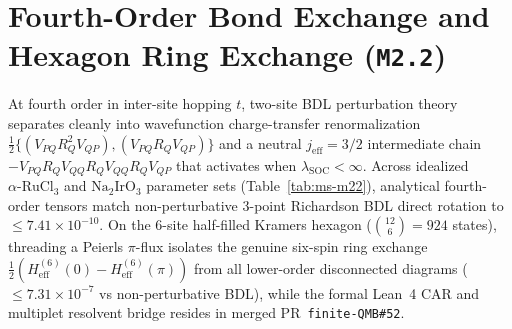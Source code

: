 \documentclass[11pt,a4paper]{article}
\begin{document}
\section{Fourth-Order Bond Exchange and Hexagon Ring Exchange (\texttt{M2.2})}
At fourth order in inter-site hopping $t$, two-site BDL perturbation theory separates cleanly into wavefunction charge-transfer renormalization $\frac{1}{2}\{(V_{PQ}R_Q^2V_{QP}),(V_{PQ}R_QV_{QP})\}$ and a neutral $j_{\mathrm{eff}}=3/2$ intermediate chain $-V_{PQ}R_QV_{QQ}R_QV_{QQ}R_QV_{QP}$ that activates when $\lambda_{\mathrm{SOC}} < \infty$. Across idealized $\alpha\text{-RuCl}_3$ and $\text{Na}_2\text{IrO}_3$ parameter sets (Table~\ref{tab:ms-m22}), analytical fourth-order tensors match non-perturbative $3$-point Richardson BDL direct rotation to $\le 7.41\times 10^{-10}$. On the $6$-site half-filled Kramers hexagon ($\binom{12}{6}=924$ states), threading a Peierls $\pi$-flux isolates the genuine six-spin ring exchange $\frac{1}{2}(H_{\mathrm{eff}}^{(6)}(0) - H_{\mathrm{eff}}^{(6)}(\pi))$ from all lower-order disconnected diagrams ($\le 7.31\times 10^{-7}$ vs non-perturbative BDL), while the formal Lean~4 CAR and multiplet resolvent bridge resides in merged PR~\texttt{finite-QMB\#52}.

\begin{table}[htbp]
  \centering
  \scriptsize
  \caption{Fourth-order exchange decomposition and 6-site hexagon ring-exchange benchmarks across idealized Hubbard--Kanamori--SOC parameter sets.}
  \label{tab:ms-m22}
\end{table}
\end{document}
